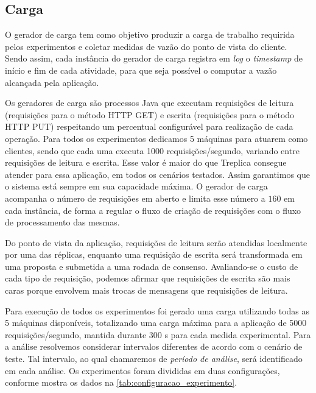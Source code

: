 \subsection{Carga}\label{subsec:carga}

O gerador de carga tem como objetivo produzir a carga de trabalho requirida pelos
experimentos e coletar medidas de vazão do ponto de vista do cliente. Sendo assim, cada
instância do gerador de carga registra em \emph{log} o \emph{timestamp} de início
e fim de cada atividade, para que seja possível o computar a vazão alcançada pela
aplicação.

Os geradores de carga são processos Java que executam requisições de leitura (requisições
para o método HTTP GET) e escrita (requisições para o método HTTP PUT) respeitando um
percentual configurável para realização de cada operação. Para todos os experimentos
dedicamos 5 máquinas para atuarem como clientes, sendo que cada uma executa 1000
requisições/segundo, variando entre requisições de leitura e escrita. Esse valor é maior
do que Treplica consegue atender para essa aplicação, em todos os cenários testados. Assim
garantimos que o sistema está sempre em sua capacidade máxima. O gerador de carga
acompanha o número de requisições em aberto e limita esse número a $160$ em cada
instância, de forma a regular o fluxo de criação de requisições com o fluxo de
processamento das mesmas.

Do ponto de vista da aplicação, requisições de leitura serão atendidas localmente por uma
das réplicas, enquanto uma requisição de escrita será transformada em uma proposta e
submetida a uma rodada de consenso. Avaliando-se o custo de cada tipo de requisição,
podemos afirmar que requisições de escrita são mais caras porque envolvem mais trocas de
mensagens que requisições de leitura.

Para execução de todos os experimentos foi gerado uma carga utilizando todas as 5 máquinas
disponíveis, totalizando uma carga máxima para a aplicação de 5000 requisições/segundo,
mantida durante 300 s para cada medida experimental. Para a análise resolvemos considerar
intervalos diferentes de acordo com o cenário de teste. Tal intervalo, ao qual chamaremos
de \emph{período de análise}, será identificado em cada análise. Os experimentos foram
divididas em duas configurações, conforme mostra os dados na
\autoref{tab:configuracao_experimento}.

\begin{table}[htb]
\end{table}

